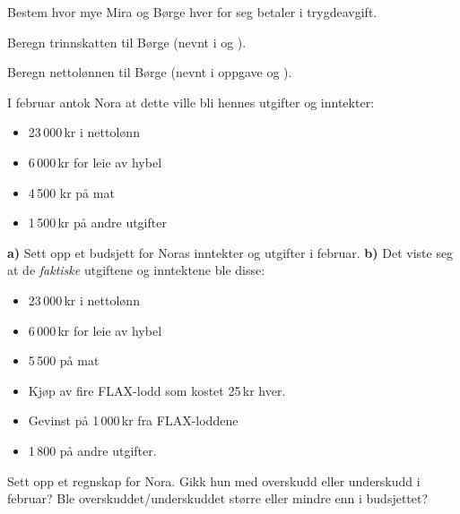 Bestem hvor mye Mira og Børge hver for seg betaler i trygdeavgift.

Beregn trinnskatten til Børge (nevnt i  og ).

Beregn nettolønnen til Børge (nevnt i oppgave  og ).

\nes

I februar antok Nora at dette ville bli hennes utgifter og inntekter:
\begin{itemize}
	\item 23\,000\,kr i nettolønn 
	\item 6\,000\,kr for leie av hybel
	\item 4\,500 kr på mat
	\item 1\,500\,kr på andre utgifter
\end{itemize}
\textbf{a)} Sett opp et budsjett for Noras inntekter og utgifter i februar.\os
\textbf{b)} Det viste seg at de \textsl{faktiske} utgiftene og inntektene ble disse:
\begin{itemize}
	\item 23\,000\,kr i nettolønn
	\item 6\,000\,kr for leie av hybel
	\item 5\,500 på mat
	\item Kjøp av fire FLAX-lodd som kostet 25\,kr hver.
	\item Gevinst på 1\,000\,kr fra FLAX-loddene
	\item 1\,800 på andre utgifter.
\end{itemize}
Sett opp et regnskap for Nora. Gikk hun med overskudd eller underskudd i februar? Ble overskuddet/underskuddet større eller mindre enn i budsjettet?



